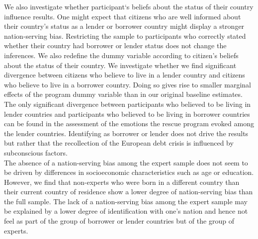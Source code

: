 We also investigate whether participant`s beliefs about the status of their country influence results. One might expect that citizens who are well informed about their country's status as a lender or borrower country might display a stronger nation-serving bias. Restricting the sample to participants who correctly stated whether their country had borrower or lender status does not change the inferences. We also redefine the dummy variable according to citizen's beliefs about the status of their country. We investigate whether we find significant divergence between citizens who believe to live in a lender country and citizens who believe to live in a borrower country. Doing so gives rise to smaller marginal effects of the program dummy variable than in our original baseline estimates. The only significant divergence between participants who believed to be living in lender countries and participants who believed to be living in borrower countries can be found in the assessment of the emotions the rescue program evoked among the lender countries. Identifying as borrower or lender does not drive the results but rather that the recollection of the European debt crisis is influenced by subconscious factors. 
\\
The absence of a nation-serving bias among the expert sample does not seem to be driven by differences in socioeconomic characteristics such as age or education.  However, we find that non-experts who were born in a different country than their current country of residence show a lower degree of nation-serving bias than the full sample. The lack of  a nation-serving bias among the expert sample may be explained by a lower degree of identification with one's nation and hence not feel as part of the group of borrower or lender countries but of the group of experts. 

